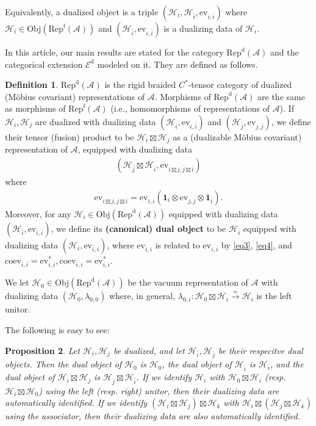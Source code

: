 \documentclass[12pt,a4paper]{article}
\theoremstyle{definition}
\newtheorem{df}{Definition}[section]
\theoremstyle{plain}
\newtheorem{pp}[df]{Proposition}
\newcommand{\mc}{\mathcal}
\newcommand{\ovl}{\overline}
\newcommand{\id}{\mathbf{1}}
\newcommand{\ev}{\mathrm{ev}}
\newcommand{\coev}{\mathrm{coev}}
\newcommand{\RepdA}{\mathrm{Rep}^{\mathrm d}(\mc A)}
\newcommand{\RepfA}{\mathrm{Rep}^{\mathrm f}(\mc A)}
\newcommand{\Obj}{\mathrm{Obj}}
\newcommand{\Ed}{\mathscr E^{\mathrm d}}
\numberwithin{equation}{section}
\begin{document}
Equivalently, a dualized object is a triple $(\mc H_i,\mc H_{\ovl i},\ev_{i,\ovl i})$ where $\mc H_i\in\Obj(\RepfA)$ and $(\mc H_{\ovl i},\ev_{i,\ovl i})$ is a dualizing data of $\mc H_i$.

In this article, our main results are stated for the category $\RepdA$ and the categorical extension $\Ed$ modeled on it. They are defined as follows.

\begin{df}\label{lb31}
$\RepdA$ is the rigid braided $C^*$-tensor category of dualized (M\"obius covariant) representations of $\mc A$. Morphisms of $\RepdA$ are the same as morphisms of $\RepfA$ (i.e., homomorphisms of representations of $\mc A$). If $\mc H_i,\mc H_j$ are dualized with dualizing data $(\mc H_{\ovl i},\ev_{i,\ovl i})$ and $(\mc H_{\ovl j},\ev_{j,\ovl j})$, we define their tensor (fusion) product to be $\mc H_i\boxtimes\mc H_j$ as a (dualizable M\"obius covariant) representation of $\mc A$, equipped with dualizing data
\begin{align*}
	(\mc H_{\ovl j}\boxtimes\mc H_{\ovl i},\ev_{i\boxtimes j,\ovl j\boxtimes\ovl i})
\end{align*}
where
\begin{align*}
\ev_{i\boxtimes j,\ovl j\boxtimes\ovl i}	=\ev_{i,\ovl i}(\id_i\otimes\ev_{j,\ovl j}\otimes\id_{\ovl i}).
\end{align*}
Moreover, for any $\mc H_i\in\Obj(\RepdA)$ equipped with dualizing data $(\mc H_{\ovl i},\ev_{i,\ovl i})$, we define its \textbf{(canonical) dual object} to be $\mc H_{\ovl i}$ equipped with dualizing data $(\mc H_i,\ev_{\ovl i,i})$, where $\ev_{\ovl i,i}$ is related to $\ev_{i,\ovl i}$ by \eqref{eq3}, \eqref{eq4}, and $\coev_{i,\ovl i}=\ev_{i,\ovl i}^*,\coev_{\ovl i,i}=\ev_{\ovl i,i}^*$.

We let $\mc H_0\in\Obj(\RepdA)$ be the vacuum representation of $\mc A$ with dualizing data $(\mc H_0,\lambda_{0,0})$ where, in general, $\lambda_{0,i}:\mc H_0\boxtimes\mc H_i\xrightarrow{\simeq}\mc H_i$ is the left unitor.
\end{df}

The following is easy to see:

\begin{pp}
Let $\mc H_i,\mc H_j$ be dualized, and let $\mc H_{\ovl i},\mc H_{\ovl j}$ be their respecitve dual objects. Then the dual object of $\mc H_0$ is $\mc H_0$, the dual object of $\mc H_{\ovl i}$ is $\mc H_i$, and the dual object of $\mc H_i\boxtimes \mc H_j$ is $\mc H_{\ovl j}\boxtimes \mc H_{\ovl i}$. If we identify $\mc H_i$ with $\mc H_0\boxtimes\mc H_i$ (resp. $\mc H_i\boxtimes\mc H_0$) using the left (resp. right) unitor, then their dualizing data are automatically identified. If we identify $(\mc H_i\boxtimes\mc H_j)\boxtimes\mc H_k$ with $\mc H_i\boxtimes(\mc H_j\boxtimes\mc H_k)$ using the associator, then their dualizing data are also automatically identified.
\end{pp}
\end{document}
